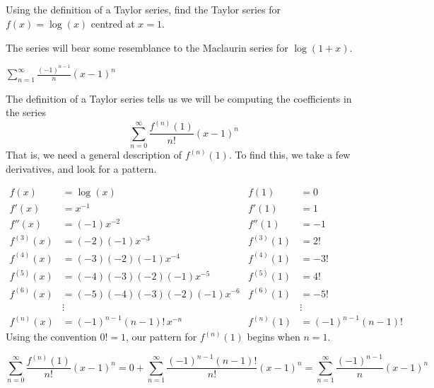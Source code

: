 \subsection*{\Procedural}
\begin{question}\label{TSdef1}
Using the definition of a Taylor series, find the Taylor series for $f(x)=\log(x)$ centred at $x=1$.
\end{question}
\begin{hint}
The series will bear some resemblance to the Maclaurin series for $\log(1+x)$.
\end{hint}
\begin{answer}
$\displaystyle\sum_{n=1}^\infty \frac{(-1)^{n-1}}{n}(x-1)^n$
\end{answer}
\begin{solution}
The definition of a Taylor series tells us we will be computing the coefficients in the series
\[\sum_{n=0}^\infty \frac{f^{(n)}(1)}{n!}(x-1)^n\]
That is, we need a general description of $f^{(n)}(1)$. To find this, we take a few derivatives, and look for a pattern.

\begin{align*}
f(x)&=\log(x) & f(1)&=0\\
f'(x)&=x^{-1} & f'(1)&=1\\
f''(x)&=(-1)x^{-2} & f''(1)&=-1\\
f^{(3)}(x)&=(-2)(-1)x^{-3}& f^{(3)}(1)&=2!\\
f^{(4)}(x)&=(-3)(-2)(-1)x^{-4}& f^{(4)}(1)&=-3!\\
f^{(5)}(x)&=(-4)(-3)(-2)(-1)x^{-5}& f^{(5)}(1)&=4!\\
f^{(6)}(x)&=(-5)(-4)(-3)(-2)(-1)x^{-6}& f^{(6)}(1)&=-5!\\
&\vdots&&\vdots\\
f^{(n)}(x)&=(-1)^{n-1}(n-1)!\,x^{-n} & f^{(n)}(1)&=(-1)^{n-1}(n-1)!
\end{align*}
Using the convention $0!=1$, our pattern for $f^{(n)}(1)$ begins when $n=1$.

\[\sum_{n=0}^\infty \frac{f^{(n)}(1)}{n!}(x-1)^n
=0+\sum_{n=1}^\infty \frac{(-1)^{n-1}(n-1)! }{n!}(x-1)^n
=\sum_{n=1}^\infty \frac{(-1)^{n-1}}{n}(x-1)^n
\]

\end{solution}
